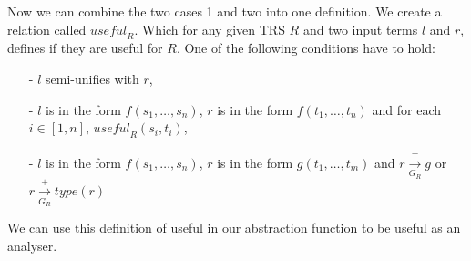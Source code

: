 Now we can combine the two cases 1 and two into one definition. We create a relation called $\textit{useful}_R$. Which for any given TRS $R$ and two input terms $l$ and $r$, defines if they are useful for $R$. One of the following conditions have to hold:
\begin{itemize}
    \itemsep 0em
    \item[-] $l$ semi-unifies with $r$,
    \item[-] $l$ is in the form $f(s_1, \dots, s_n)$, $r$ is in the form $f(t_1, \dots, t_n)$ and for each $i \in [1, n]$, $\textit{useful}_R(s_i, t_i)$,
    \item[-] $l$ is in the form $f(s_1, \dots, s_n)$, $r$ is in the form $g(t_1, \dots, t_m)$ and $r \xrightarrow[G_R]{+} g$ or $r \xrightarrow[G_R]{+} \textit{type}(r)$
\end{itemize}

We can use this definition of useful in our abstraction function to be useful as an analyser. 